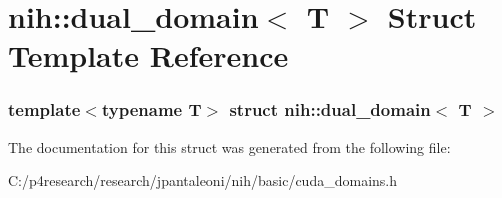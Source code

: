 \hypertarget{structnih_1_1dual__domain}{
\section{nih\-:\-:dual\-\_\-domain$<$ \-T $>$ \-Struct \-Template \-Reference}
\label{structnih_1_1dual__domain}
}
\subsubsection*{template$<$typename T$>$ struct nih\-::dual\-\_\-domain$<$ T $>$}



\-The documentation for this struct was generated from the following file\-:\begin{DoxyCompactItemize}
\item 
\-C\-:/p4research/research/jpantaleoni/nih/basic/cuda\-\_\-domains.\-h\end{DoxyCompactItemize}
